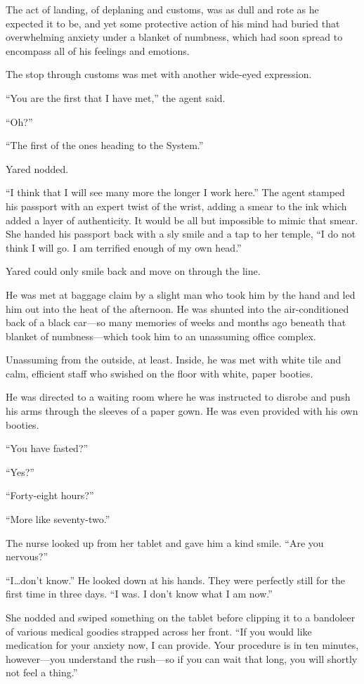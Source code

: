 The act of landing, of deplaning and customs, was as dull and rote as he expected it to be, and yet some protective action of his mind had buried that overwhelming anxiety under a blanket of numbness, which had soon spread to encompass all of his feelings and emotions.

The stop through customs was met with another wide-eyed expression.

``You are the first that I have met,'' the agent said.

``Oh?''

``The first of the ones heading to the System.''

Yared nodded.

``I think that I will see many more the longer I work here.'' The agent stamped his passport with an expert twist of the wrist, adding a smear to the ink which added a layer of authenticity. It would be all but impossible to mimic that smear. She handed his passport back with a sly smile and a tap to her temple, ``I do not think I will go. I am terrified enough of my own head.''

Yared could only smile back and move on through the line.

He was met at baggage claim by a slight man who took him by the hand and led him out into the heat of the afternoon. He was shunted into the air-conditioned back of a black car---so many memories of weeks and months ago beneath that blanket of numbness---which took him to an unassuming office complex.

Unassuming from the outside, at least. Inside, he was met with white tile and calm, efficient staff who swished on the floor with white, paper booties.

He was directed to a waiting room where he was instructed to disrobe and push his arms through the sleeves of a paper gown. He was even provided with his own booties.

``You have fasted?''

``Yes?''

``Forty-eight hours?''

``More like seventy-two.''

The nurse looked up from her tablet and gave him a kind smile. ``Are you nervous?''

``I\ldots don't know.'' He looked down at his hands. They were perfectly still for the first time in three days. ``I was. I don't know what I am now.''

She nodded and swiped something on the tablet before clipping it to a bandoleer of various medical goodies strapped across her front. ``If you would like medication for your anxiety now, I can provide. Your procedure is in ten minutes, however---you understand the rush---so if you can wait that long, you will shortly not feel a thing.''

